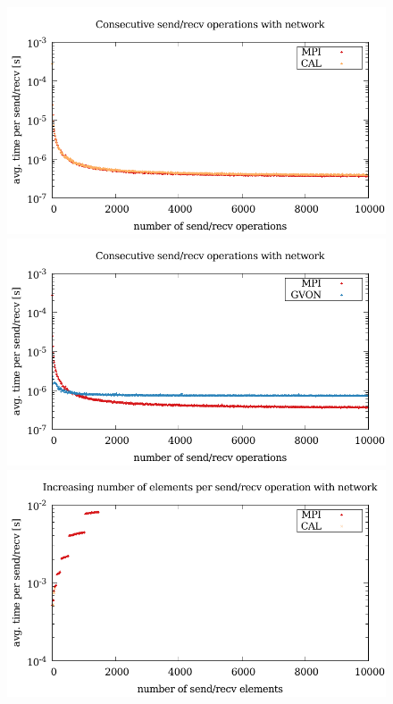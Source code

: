 \begin{figure}[H]
  \begin{minipage}[t]{0.5\textwidth}
    \includegraphics[width=\textwidth]{plots/50_nsend_network_cal_kepler}
    \includegraphics[width=\textwidth]{plots/50_nsend_network_gvon_kepler}
    \includegraphics[width=\textwidth]{plots/50_nsize_network_cal_kepler}

\end{minipage}
\end{figure}
